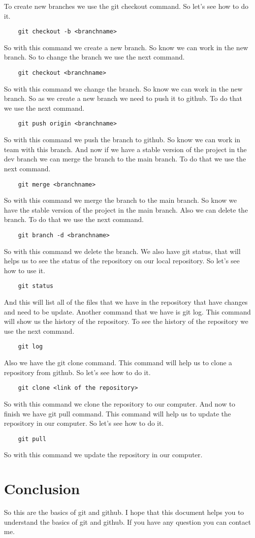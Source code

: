 \documentclass{article}
\begin{document}
To create new branches we use the git checkout command. So let's see how to do it.
\begin{lstlisting}
    git checkout -b <branchname>
\end{lstlisting}
So with this command we create a new branch. So know we can work in the new branch. So to change the branch we use the next command.
\begin{lstlisting}
    git checkout <branchname>
\end{lstlisting}
So with this command we change the branch. So know we can work in the new branch. So as we create a new branch we need to push it to github. To do that 
we use the next command.
\begin{lstlisting}
    git push origin <branchname>
\end{lstlisting}
So with this command we push the branch to github. So know we can work in team with this branch. 
And now if we have a stable version of the project in the dev branch we can merge the branch to the main branch. To do that we use the next command.
\begin{lstlisting}
    git merge <branchname>
\end{lstlisting}
So with this command we merge the branch to the main branch. So know we have the stable version of the project in the main branch.
Also we can delete the branch. To do that we use the next command.
\begin{lstlisting}
    git branch -d <branchname>
\end{lstlisting}
So with this command we delete the branch.
We also have git status, that will helps us to see the status of the repository on our local repository. 
So let's see how to use it.
\begin{lstlisting}
    git status
\end{lstlisting}
And this will list all of the files that we have in the repository that have changes and need 
to be update. Another command that we have is git log. 
This command will show us the history of the repository. To see the history of the repository 
we use the next command.
\begin{lstlisting}
    git log
\end{lstlisting}
Also we have the git clone command. This command will help us to clone a repository from github.
So let's see how to do it.
\begin{lstlisting}
    git clone <link of the repository>
\end{lstlisting}
So with this command we clone the repository to our computer. And now to finish we have git pull command.
This command will help us to update the repository in our computer. So let's see how to do it.
\begin{lstlisting}
    git pull
\end{lstlisting}
So with this command we update the repository in our computer. 
\section*{Conclusion}

So this are the basics of git and github. I hope that this document helps you to understand 
the basics of git and github. If you have any question you can contact me.                                                                          
\end{document}
